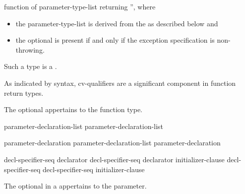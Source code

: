 function of parameter-type-list
 
returning '', where
\begin{itemize}
\item
the parameter-type-list is derived from
the  as described below and
\item
the optional  is present if and only if
the exception specification is non-throwing.
\end{itemize}
Such a type is a .
\begin{footnote}
As indicated by syntax, cv-qualifiers are a significant component in function return types.
\end{footnote}
The optional 
appertains to the function type.

\pnum
{}%
\begin{bnf}
\br
    \br
    \br
    parameter-declaration-list \terminal{,} \br
    parameter-declaration-list 
\end{bnf}

\begin{bnf}
\br
    parameter-declaration\br
    parameter-declaration-list \terminal{,} parameter-declaration
\end{bnf}

\begin{bnf}
\br
      decl-specifier-seq declarator\br
     decl-specifier-seq declarator \terminal{=} initializer-clause\br
      decl-specifier-seq \br
     decl-specifier-seq  \terminal{=} initializer-clause
\end{bnf}

The optional  in a 
appertains to the parameter.

